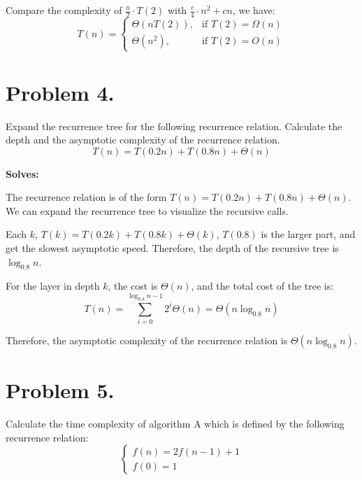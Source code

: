 \documentclass{article}
\begin{document}
Compare the complexity of $\frac{n}{2}\cdot T(2)$ with $\frac{c}{4}\cdot n^2+cn$, we have:
\begin{equation*}
    T(n)  = \begin{cases}
        \Theta(nT(2)), & \text{if } T(2) = \Omega(n) \\
        \Theta(n^2),   & \text{if } T(2) = O(n)
    \end{cases}
\end{equation*}

\section{Problem 4.}

Expand the recurrence tree for the following recurrence relation. Calculate the depth and the asymptotic complexity of the recurrence relation.
\begin{equation}
    T(n) = T(0.2n) + T(0.8n) + \Theta(n)
\end{equation}

\textbf{Solves:}

The recurrence relation is of the form $T(n) = T(0.2n) + T(0.8n) + \Theta(n)$. We can expand the recurrence tree to visualize the recursive calls.

Each $k$, $T(k) = T(0.2k) + T(0.8k) + \Theta(k)$, $T(0.8)$ is the larger part, and get the slowest asymptotic speed. Therefore, the depth of the recursive tree is $\log_{0.8}n$.

For the layer in depth $k$, the cost is $\Theta(n)$, and the total cost of the tree is:
\begin{equation*}
    T(n) = \sum_{i=0}^{\log_{0.8}n-1}2^i\Theta(n) = \Theta(n\log_{0.8}n)
\end{equation*}

Therefore, the asymptotic complexity of the recurrence relation is $\boxed{\Theta(n\log_{0.8}n)}$.

\section{Problem 5.}
Calculate the time complexity of algorithm A which is defined by the following recurrence relation:
\begin{equation}
    \begin{cases}
        f(n) = 2f(n-1)+1 \\
        f(0) = 1
    \end{cases}
\end{equation}
\end{document}
